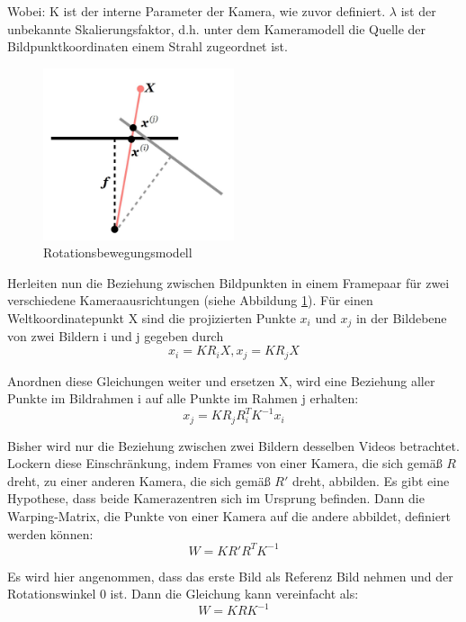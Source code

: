 Wobei: K ist der interne Parameter der Kamera, wie zuvor definiert. $\lambda$ ist der unbekannte Skalierungsfaktor, d.h. unter dem Kameramodell die Quelle der Bildpunktkoordinaten einem Strahl zugeordnet ist.

\begin{figure}[H]
 \centering 
 \includegraphics[keepaspectratio,width=0.5\textwidth]{images/4_ZweiteErfahrung/Kamera/rotationsmodel.pdf}
 \caption{Rotationsbewegungsmodell}
 \label{fig:rotationsmodel}
\end{figure} 


Herleiten nun die Beziehung zwischen Bildpunkten in einem Framepaar für zwei verschiedene Kameraausrichtungen (siehe Abbildung \ref{fig:rotationsmodel}). Für einen Weltkoordinatepunkt X sind die projizierten Punkte $x_i$ und $x_j$ in der Bildebene von zwei Bildern i und j gegeben durch
\begin{equation}
   x_i = KR_iX, x_j = KR_jX
\end{equation}

Anordnen diese Gleichungen weiter und ersetzen X, wird eine Beziehung aller Punkte im Bildrahmen i auf alle Punkte im Rahmen j erhalten:
\begin{equation}
   x_j = KR_jR_i^TK^{-1}x_i
\end{equation}

Bisher wird nur die Beziehung zwischen zwei Bildern desselben Videos betrachtet. Lockern diese Einschränkung, indem Frames von einer Kamera, die sich gemäß $R$ dreht, zu einer anderen Kamera, die sich gemäß $R'$ dreht, abbilden. Es gibt eine Hypothese, dass beide Kamerazentren sich im Ursprung befinden. Dann die Warping-Matrix, die Punkte von einer Kamera auf die andere abbildet, definiert werden können:
\begin{equation}
   W = KR'R^TK^{-1}
\end{equation}

Es wird hier angenommen, dass das erste Bild als Referenz Bild nehmen und der Rotationswinkel 0 ist. Dann die Gleichung kann vereinfacht als:
\begin{equation}
   W = KRK^{-1}
\end{equation}

